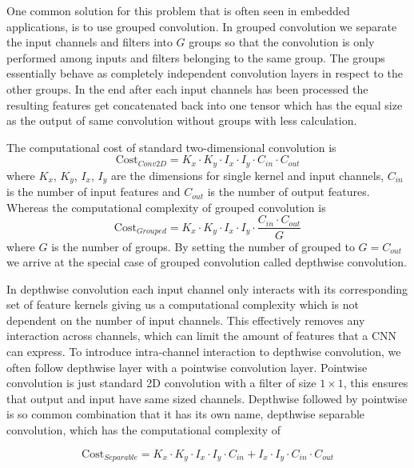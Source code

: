 \documentclass[12pt,a4paper,english
]{tunithesis}
\begin{document}
One common solution for this problem that is often seen in embedded applications, is to use grouped convolution. In grouped convolution we separate the input channels and filters into $G$ groups so that the convolution is only performed among inputs and filters belonging to the same group. The groups essentially behave as completely independent convolution layers in respect to the other groups.  In the end after each input channels has been processed the resulting features get concatenated back into one tensor which has the equal size as the output of same convolution without groups with less calculation.~\cite{howard2017mobilenetsefficientconvolutionalneural, tan_efficientnet_2020}

The computational cost of standard two-dimensional convolution is
\begin{equation}
\text{Cost}_{Conv2D} = K_{x} \cdot K_{y} \cdot I_{x} \cdot I_{y} \cdot C_{in} \cdot C_{out}
\end{equation}
where $K_{x}$, $K_{y}$, $I_{x}$, $I_{y}$ are the dimensions for single kernel and input channels, $C_{in}$ is the number of input features and $C_{out}$ is the number of output features. Whereas the computational complexity of grouped convolution is
\begin{equation}
\text{Cost}_{Grouped} =
  K_{x} \cdot K_{y} \cdot I_{x} \cdot I_{y} \cdot \frac{C_{in} \cdot C_{out}}{G}
\end{equation}
where $G$ is the number of groups. By setting the number of grouped to $G = C_{out}$ we arrive at the special case of grouped convolution called depthwise convolution.

In depthwise convolution each input channel only interacts with its corresponding set of feature kernels giving us a computational complexity which is not dependent on the number of input channels. This effectively removes any interaction across channels, which can limit the amount of features that a CNN can express. To introduce intra-channel interaction to depthwise convolution, we often follow depthwise layer with a pointwise convolution layer. Pointwise convolution is just standard 2D convolution with a filter of size $1 \times 1$, this ensures that output and input have same sized channels. Depthwise followed by pointwise is so common combination that it has its own name, depthwise separable convolution, which has the computational complexity of

\begin{equation}
\text{Cost}_{Separable} =
  K_{x} \cdot K_{y} \cdot I_{x} \cdot I_{y} \cdot  C_{in} + I_{x} \cdot I_{y} \cdot C_{in} \cdot C_{out}
\end{equation}
\end{document}
